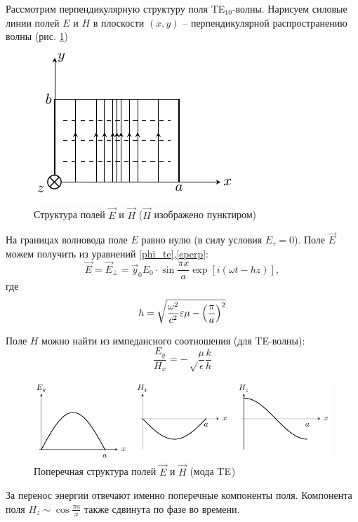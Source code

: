 Рассмотрим перпендикулярную структуру поля TE$_{10}$-волны. Нарисуем силовые линии полей $E$ и $H$ в плоскости $(x,y)$ -- перпендикулярной распространению волны (рис. \ref{fig:lect4:8})
\begin{figure}[h!]
	\centering
	\includegraphics[scale=1.5]{img/lect4_ris8}
	\caption{Структура полей $\vec{E}$ и $\vec{H}$ ($\vec{H}$ изображено пунктиром)}
	\label{fig:lect4:8}
\end{figure}

На границах волновода поле $E$ равно нулю (в силу условия $E_\tau=0$). Поле $\vec{E}$ можем получить из уравнений \eqref{phi_te},\eqref{eperp}:
\begin{equation}
	\vec{E}=\vec{E}_\perp=\vec{y}_0E_0\cdot\sin\frac{\pi x}{a}\exp[i(\omega t - hz)],
\end{equation}
где 
\begin{equation}
	h=\sqrt{
		\frac{\omega^2}{c^2}\varepsilon \mu - \qty(\frac{\pi}{a})^2
	}
\end{equation}

Поле $H$ можно найти из импедансного соотношения (для TE-волны):
\begin{equation}
	\frac{E_y}{H_x}=-\sqrt\frac{\mu}{\epsilon}\frac{k}{h}
\end{equation}

\begin{figure}[h!]
	\centering
	\includegraphics[width=\textwidth]{img/lect4_ris9}
	\caption{Поперечная структура полей $\vec{E}$ и $\vec{H}$ (мода TE$_{}$)}
	\label{fig:lect4:9}
\end{figure}

За перенос энергии отвечают именно поперечные компоненты поля. Компонента поля
$H_z \sim \cos\frac{\pi a}{x}$ также сдвинута по фазе во времени. 


